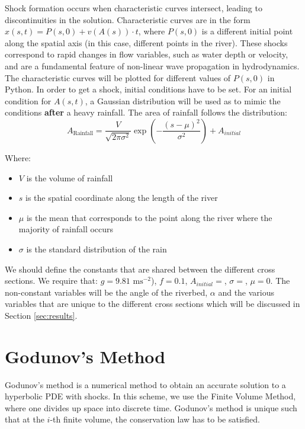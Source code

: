 \documentclass[12pt]{article}
\begin{document}
Shock formation occurs when characteristic curves intersect, leading to discontinuities in the solution. Characteristic curves are in the form $ x(s, t) = P(s, 0) + v(A(s))\cdot t$, where $P(s, 0)$ is a different initial point along the spatial axis (in this case, different points in the river). These shocks correspond to rapid changes in flow variables, such as water depth or velocity, and are a fundamental feature of non-linear wave propagation in hydrodynamics. The characteristic curves will be plotted for different values of $P(s, 0)$ in Python. In order to get a shock, initial conditions have to be set. For an initial condition for $A(s, t)$, a Gaussian distribution will be used as to mimic the conditions \textbf{after} a heavy rainfall. The area of rainfall follows the distribution:
\begin{equation}
     A_\text{Rainfall} = \frac{V}{\sqrt{2\pi\sigma^2}}\exp{\left(-\frac{(s - \mu)^2}{\sigma^2}\right)} + A_{initial}
\end{equation}

Where:
\begin{itemize}
    \item $V$ is the volume of rainfall
    \item $s$ is the spatial coordinate along the length of the river
    \item $\mu$ is the mean that corresponds to the point along the river where the majority of rainfall occurs
    \item $\sigma$ is the standard distribution of the rain
\end{itemize}

We should define the constants that are shared between the different cross sections. We require that: $g = 9.81 \text{ ms}^{-2}$), $f = 0.1$, $A_{initial} = $, $\sigma = $, $\mu  = 0$. The non-constant variables will be the angle of the riverbed, $\alpha$ and the various variables that are unique to the different cross sections which will be discussed in Section \ref{sec:results}.

\section{Godunov's Method}
Godunov's method is a numerical method to obtain an accurate solution to a hyperbolic PDE with shocks. In this scheme, we use the Finite Volume Method, where one divides up space into discrete time. Godunov's method is unique such that at the $i$-th finite volume, the conservation law has to be satisfied.
\end{document}
